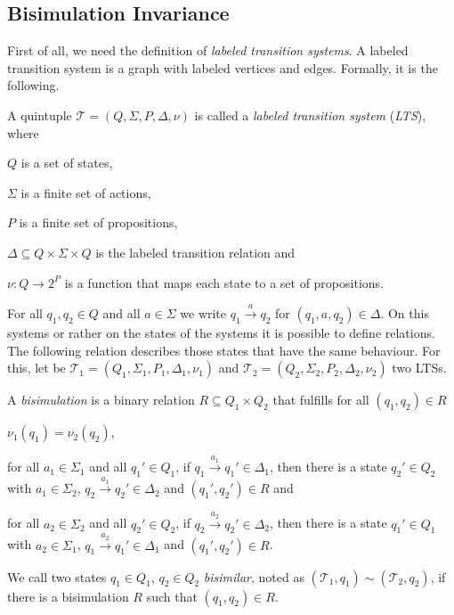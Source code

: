 
\subsection{Bisimulation Invariance}\label{subsec:bisimulationInvariance}

First of all, we need the definition of \textit{labeled transition systems}. A labeled transition system is a graph
with labeled vertices and edges. Formally, it is the following.

\begin{definition}
    A quintuple $\mathcal{T} = (Q, \Sigma, P, \Delta, \nu)$ is called a \emph{labeled transition system} (\emph{LTS}),
    where
    \begin{compactitem}
        \item $Q$ is a set of states,
        \item $\Sigma$ is a finite set of actions,
        \item $P$ is a finite set of propositions,
        \item $\Delta \subseteq Q \times \Sigma \times Q$ is the labeled transition relation and
        \item $\nu: Q \rightarrow 2^P$ is a function that maps each state to a set of propositions.
    \end{compactitem}
\end{definition}

For all $q_1, q_2 \in Q$ and all $a \in \Sigma$ we write $q_1 \overset{a}{\rightarrow} q_2$ for $(q_1, a, q_2) \in
\Delta$. On this systems or rather on the states of the systems it is possible to define relations. The
following relation describes those states that have the same behaviour. For this, let be $\mathcal{T}_1 = (Q_1,
\Sigma_1, P_1, \Delta_1, \nu_1)$ and $\mathcal{T}_2 = (Q_2, \Sigma_2, P_2, \Delta_2, \nu_2)$ two LTSs.

\begin{definition}
    A \emph{bisimulation} is a binary relation $R \subseteq Q_1 \times Q_2$ that fulfills for all $(q_1, q_2) \in R$
    \begin{compactitem}
        \item $\nu_1 (q_1) = \nu_2 (q_2)$,
        \item for all $a_1 \in \Sigma_1$ and all $q_1' \in Q_1$, if $q_1 \overset{a_1}{\rightarrow} q_1' \in
        \Delta_1$, then there is a state $q_2' \in Q_2$ with $a_1 \in \Sigma_2$, $q_2
        \overset{a_1}{\rightarrow} q_2' \in \Delta_2$ and $(q_1', q_2') \in R$ and
        \item for all $a_2 \in \Sigma_2$ and all $q_2' \in Q_2$, if $q_2 \overset{a_2}{\rightarrow} q_2' \in
        \Delta_2$, then there is a state $q_1' \in Q_1$ with $a_2 \in \Sigma_1$, $q_1
        \overset{a_2}{\rightarrow} q_1' \in \Delta_1$ and $(q_1', q_2') \in R$.
    \end{compactitem}
    We call two states $q_1 \in Q_1$, $q_2 \in Q_2$ \emph{bisimilar}, noted as $(\mathcal{T}_1, q_1) \sim
    (\mathcal{T}_2, q_2)$, if there
    is a bisimulation $R$ such that $(q_1, q_2) \in R$.
\end{definition}

